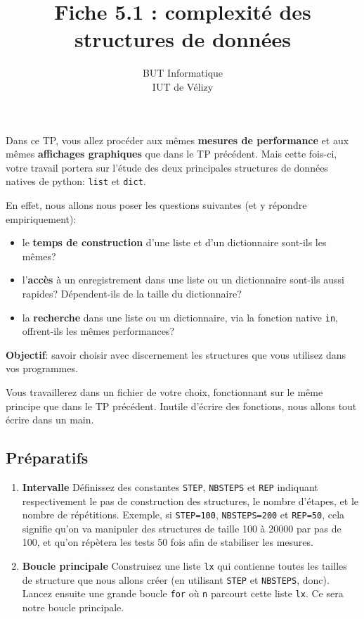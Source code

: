 \documentclass[11pt,a4paper]{article}
\title{Fiche 5.1 : complexité des structures de données}
\author{BUT Informatique\\
IUT de Vélizy\\
}
\date{}
\newcommand{\checkbox}{$\square$ \smallskip}
\newcounter{exo} \setcounter{exo}{0}
\newenvironment{action}{%
    \begin{enumerate}[\numerotation] \addtocounter{exo}{-1}%
        }{%
    \end{enumerate}
}
\newcommand{\numexoa}{\theexo \addtocounter{exo}{1}}
\newcommand{\numerotation}{\checkbox \smallskip \numexoa.}
\begin{document}
\maketitle





\thispagestyle{empty}

Dans ce TP, vous allez procéder aux mêmes {\bf mesures de performance} et aux mêmes {\bf affichages graphiques} que dans le TP précédent. Mais cette fois-ci, votre travail portera sur l'étude des deux principales structures de données natives de python: {\tt list} et {\tt dict}.\ 

En effet, nous allons nous poser les questions suivantes (et y répondre empiriquement):
\begin{itemize}
  \item le {\bf temps de construction} d'une liste et d'un dictionnaire sont-ils les mêmes?
  \item l'{\bf accès} à un enregistrement dans une liste ou un dictionnaire sont-ils aussi rapides? Dépendent-ils de la taille du dictionnaire?
  \item la {\bf recherche} dans une liste ou un dictionnaire, via la fonction native {\tt in}, offrent-ils les mêmes performances?
\end{itemize}

{\bf Objectif}: savoir choisir avec discernement les structures que vous utilisez dans vos programmes.\ 

Vous travaillerez dans un fichier de votre choix, fonctionnant sur le même principe que dans le TP précédent. Inutile d'écrire des fonctions, nous allons tout écrire dans un main.

\subsection*{Préparatifs}
\begin{action}
\item {\bf Intervalle} Définissez des constantes {\tt STEP}, {\tt NBSTEPS} et {\tt REP} indiquant respectivement le pas de construction des structures, le nombre d'étapes, et le nombre de répétitions. Exemple, si {\tt STEP=100}, {\tt NBSTEPS=200} et {\tt REP=50}, cela signifie qu'on va manipuler des structures de taille 100 à 20000 par pas de 100, et qu'on répètera les tests 50 fois afin de stabiliser les mesures.
\item {\bf Boucle principale} Construisez une liste {\tt lx} qui contienne toutes les tailles de structure que nous allons créer (en utilisant {\tt STEP} et {\tt NBSTEPS}, donc). Lancez ensuite une grande boucle {\tt for} où {\tt n} parcourt cette liste {\tt lx}. Ce sera notre boucle principale.
\end{action}
\end{document}
